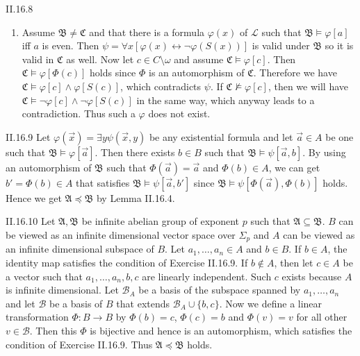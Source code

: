 \documentclass[12pt]{article}
\begin{document}
\begin{customthm}{II.16.8}
\begin{enumerate}
    \item Assume $\mathfrak{B}\neq\mathfrak{C}$ and that there is a formula $\varphi(x)$ of $\mathcal{L}$ such that $\mathfrak{B}\models\varphi[a]$ iff $a$ is even. Then  $\psi=\forall x[\varphi(x)\leftrightarrow\neg\varphi(S(x))]$ is valid under $\mathfrak{B}$ so it is valid in $\mathfrak{C}$ as well. Now let $c\in C\setminus\omega$ and assume $\mathfrak{C}\models\varphi[c]$. Then $\mathfrak{C}\models\varphi[\Phi(c)]$ holds since $\Phi$ is an automorphism of $\mathfrak{C}$. Therefore we have $\mathfrak{C}\models\varphi[c]\wedge\varphi[S(c)]$, which contradicts $\psi$. If $\mathfrak{C}\not\models\varphi[c]$, then we will have $\mathfrak{C}\models\neg\varphi[c]\wedge\neg\varphi[S(c)]$ in the same way, which anyway leads to a contradiction. Thus such a $\varphi$ does not exist.
  \end{enumerate}
\end{customthm}

\begin{customthm}{II.16.9}
  Let $\varphi(\vec{x})=\exists y\psi(\vec{x},y)$ be any existential formula and let $\vec{a}\in A$ be one such that $\mathfrak{B}\models\varphi[\vec{a}]$. Then there exists $b\in B$ such that $\mathfrak{B}\models\psi[\vec{a},b]$. By using an automorphism of $\mathfrak{B}$ such that $\Phi(\vec{a})=\vec{a}$ and $\Phi(b)\in A$, we can get $b'=\Phi(b)\in A$ that satisfies $\mathfrak{B}\models\psi[\vec{a},b']$ since $\mathfrak{B}\models\psi[\Phi(\vec{a}),\Phi(b)]$ holds. Hence we get $\mathfrak{A}\preccurlyeq\mathfrak{B}$ by Lemma II.16.4.
\end{customthm}

\begin{customthm}{II.16.10}
  Let $\mathfrak{A},\mathfrak{B}$ be infinite abelian group of exponent $p$ such that $\mathfrak{A}\subseteq\mathfrak{B}$. $B$ can be viewed as an infinite dimensional vector space over $\Sigma_p$ and $A$ can be viewed as an infinite dimensional subspace of $B$. Let $a_1,\ldots,a_n\in A$ and $b\in B$. If $b\in A$, the identity map satisfies the condition of Exercise II.16.9. If $b\not\in A$, then let $c\in A$ be a vector such that $a_1,\ldots,a_n,b,c$ are linearly independent. Such $c$ exists because $A$ is infinite dimensional. Let $\mathcal{B}_A$ be a basis of the subspace spanned by $a_1,\ldots,a_n$ and let $\mathcal{B}$ be a basis of $B$ that extends $\mathcal{B}_A\cup\{b,c\}$. Now we define a linear transformation $\Phi:B\rightarrow B$ by $\Phi(b)=c$, $\Phi(c)=b$ and $\Phi(v)=v$ for all other $v\in\mathcal{B}$. Then this $\Phi$ is bijective and hence is an automorphism, which satisfies the condition of Exercise II.16.9. Thus $\mathfrak{A}\preccurlyeq\mathfrak{B}$ holds.
\end{customthm}
\end{document}
